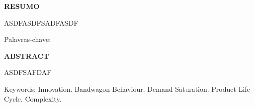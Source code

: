 \documentclass[a4paper,12pt,openright,oneside]{book}
\begin{document}
\newpage
\listoffigures

\newpage
\begin{center}
{\Large \textbf{RESUMO}}
\end{center}
\vspace{2cm}

ASDFASDFSADFASDF

\vspace{1cm}

Palavras-chave: 

\newpage
\begin{center}
{\Large \textbf{ABSTRACT}}\color[rgb]{0,0,0}
\end{center}
\vspace{2cm}

ASDFSAFDAF   

\vspace{1cm}

Keywords: Innovation. Bandwagon Behaviour. Demand Saturation. Product Life Cycle. Complexity.
\newpage


\end{document}
